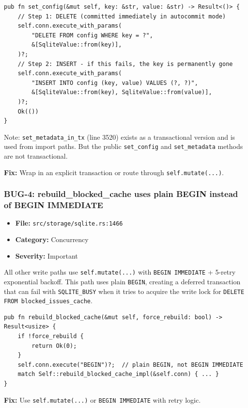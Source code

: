 \documentclass[twocolumn,10pt,letterpaper]{article}
\begin{document}
\begin{lstlisting}
pub fn set_config(&mut self, key: &str, value: &str) -> Result<()> {
    // Step 1: DELETE (committed immediately in autocommit mode)
    self.conn.execute_with_params(
        "DELETE FROM config WHERE key = ?",
        &[SqliteValue::from(key)],
    )?;
    // Step 2: INSERT - if this fails, the key is permanently gone
    self.conn.execute_with_params(
        "INSERT INTO config (key, value) VALUES (?, ?)",
        &[SqliteValue::from(key), SqliteValue::from(value)],
    )?;
    Ok(())
}
\end{lstlisting}

Note: \texttt{set\_metadata\_in\_tx} (line 3520) exists as a transactional version and is used from import paths. But the public \texttt{set\_config} and \texttt{set\_metadata} methods are not transactional.


\textbf{Fix:} Wrap in an explicit transaction or route through \texttt{self.mutate(...)}.


\subsubsection{BUG-4: rebuild\_blocked\_cache uses plain BEGIN instead of BEGIN IMMEDIATE}

\begin{itemize}
\setlength{\itemsep}{0pt}
\setlength{\parskip}{0pt}
  \item \textbf{File:} \texttt{src/storage/sqlite.rs:1466}
  \item \textbf{Category:} Concurrency
  \item \textbf{Severity:} Important
\end{itemize}

All other write paths use \texttt{self.mutate(...)} with \texttt{BEGIN IMMEDIATE} + 5-retry exponential backoff. This path uses plain \texttt{BEGIN}, creating a deferred transaction that can fail with \texttt{SQLITE\_BUSY} when it tries to acquire the write lock for \texttt{DELETE FROM blocked\_issues\_cache}.


\begin{lstlisting}
pub fn rebuild_blocked_cache(&mut self, force_rebuild: bool) -> Result<usize> {
    if !force_rebuild {
        return Ok(0);
    }
    self.conn.execute("BEGIN")?;  // plain BEGIN, not BEGIN IMMEDIATE
    match Self::rebuild_blocked_cache_impl(&self.conn) { ... }
}
\end{lstlisting}

\textbf{Fix:} Use \texttt{self.mutate(...)} or \texttt{BEGIN IMMEDIATE} with retry logic.
\end{document}
